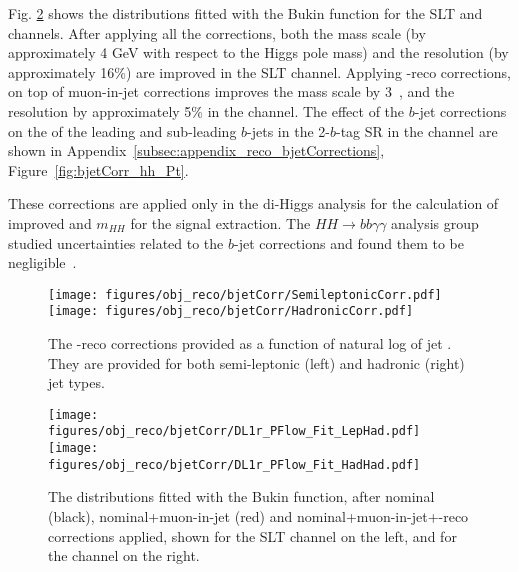 Fig. \ref{fig:bjetCorr} shows the \mbb distributions fitted with the Bukin function for the SLT \lephad and \hadhad channels.
After applying all the corrections, both the \mbb mass scale (by approximately 4 GeV with respect to the Higgs pole mass) and the \mbb resolution (by approximately 16\%) are improved in the SLT \lephad channel. 
Applying \pT-reco corrections, on top of muon-in-jet corrections improves the \mbb mass scale by 3~\GeV, and the \mbb resolution by approximately 5\% in the \hadhad channel.
The effect of the $b$-jet corrections on the \pT of the leading and sub-leading $b$-jets in the 2-$b$-tag SR in the \hadhad channel are shown in Appendix~\ref{subsec:appendix_reco_bjetCorrections}, Figure~\ref{fig:bjetCorr_hh_Pt}.

These corrections are applied only in the di-Higgs analysis for the calculation of improved \mbb and $m_{HH}$ for the signal extraction. The $HH \rightarrow bb\gamma\gamma$ analysis group studied uncertainties related to the $b$-jet corrections and found them to be negligible~\cite{ATL-COM-PHYS-2020-148}.

\begin{figure}
\centering
\texttt{[image: figures/obj\_reco/bjetCorr/SemileptonicCorr.pdf]}
\texttt{[image: figures/obj\_reco/bjetCorr/HadronicCorr.pdf]}
\caption{The \pT-reco corrections provided as a function of natural log of jet \pT. They are provided for both semi-leptonic (left) and hadronic (right) jet types.}
\label{fig:pTRecoCorr}
\end{figure}

\begin{figure}
\centering
\texttt{[image: figures/obj\_reco/bjetCorr/DL1r\_PFlow\_Fit\_LepHad.pdf]}
\texttt{[image: figures/obj\_reco/bjetCorr/DL1r\_PFlow\_Fit\_HadHad.pdf]}
\caption{The \mbb distributions fitted with the Bukin function, after nominal (black), nominal+muon-in-jet (red) and nominal+muon-in-jet+\pT-reco corrections applied, 
shown for the SLT \lephad channel on the left, and for the \hadhad channel on the right.}
\label{fig:bjetCorr}
\end{figure}
